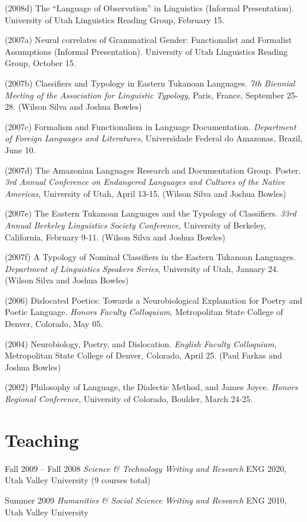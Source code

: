 \documentclass[margin,line]{resume}
\begin{document}
\begin{resume}
(2008d) The ``Language of Observation'' in Linguistics (Informal Presentation). University of Utah Linguistics Reading Group, February 15.

(2007a) Neural correlates of Grammatical Gender: Functionalist and Formalist
Assumptions (Informal Presentation). University of Utah Linguistics Reading
Group, October 15.

(2007b) Classifiers and Typology in Eastern Tukanoan Languages. \emph{7th Biennial Meeting of the Association for Linguistic Typology}, Paris, France, September 25-28.
(Wilson Silva and Joshua Bowles)

(2007c) Formalism and Functionalism in Language Documentation. \emph{Department of
Foreign Languages and Literatures}, Universidade Federal do Amazonas, Brazil,
June 10.

(2007d) The Amazonian Languages Research and Documentation Group. Poster. \emph{3rd
Annual Conference on Endangered Languages and Cultures of the Native
Americas}, University of Utah, April 13-15.
(Wilson Silva and Joshua Bowles)

(2007e) The Eastern Tukanoan Languages and the Typology of Classifiers. \emph{33rd Annual Berkeley Linguistics Society Conference}, University of Berkeley, California,
February 9-11. (Wilson Silva and Joshua Bowles)

(2007f) A Typology of Nominal Classifiers in the Eastern Tukanoan Languages.
\emph{Department of Linguistics Speakers Series}, University of Utah, January 24. (Wilson Silva and Joshua Bowles)

(2006) Dislocated Poetics: Towards a Neurobiological Explanation for Poetry and Poetic
Language. \emph{Honors Faculty Colloquium}, Metropolitan State College of Denver,
Colorado, May 05.

(2004) Neurobiology, Poetry, and Dislocation. \emph{English Faculty Colloquium}, Metropolitan State College of Denver, Colorado, April 25. (Paul Farkas and Joshua Bowles)

(2002) Philosophy of Language, the Dialectic Method, and James Joyce. \emph{Honors Regional Conference}, University of Colorado, Boulder, March 24-25.


\section{Teaching}
Fall 2009 -- Fall 2008 \emph{Science \& Technology Writing and Research} ENG 2020, Utah Valley University (9 courses total)

Summer 2009  \emph{Humanities \& Social Science Writing and Research} ENG 2010, Utah Valley University


\end{resume}
\end{document}
